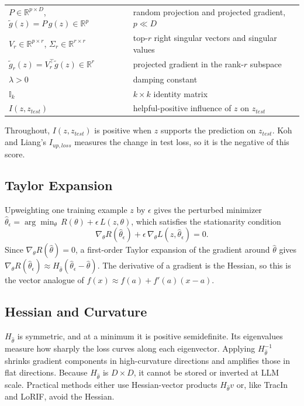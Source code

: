 \documentclass{article}
\newcommand{\hth}{\hat{\theta}}                 %
\newcommand{\Hh}{H_{\hat{\theta}}}              %
\newcommand{\gr}[1]{g(#1)}                      %
\newcommand{\gt}[1]{\tilde{g}(#1)}              %
\newcommand{\gtr}[1]{\tilde{g}_r(#1)}           %
\begin{document}
\begin{center}
\begin{tabular}{@{}ll@{}}
        $P\in\mathbb{R}^{p\times D}$, $\gt{z}=P\,\gr{z}\in\mathbb{R}^{p}$   & random projection and projected gradient, $p\ll D$ \\
        $V_r\in\mathbb{R}^{p\times r}$, $\Sigma_r\in\mathbb{R}^{r\times r}$ & top-$r$ right singular vectors and singular values \\
        $\gtr{z}=V_r^\top\gt{z}\in\mathbb{R}^{r}$                           & projected gradient in the rank-$r$ subspace        \\
        $\lambda>0$                                                         & damping constant                                   \\
        $\mathbb{I}_{k}$                                                    & $k\times k$ identity matrix                        \\
        $I(z,z_{test})$                                                     & helpful-positive influence of $z$ on $z_{test}$    \\
        \bottomrule
    \end{tabular}
\end{center}

\medskip
Throughout, $I(z,z_{test})$ is positive when $z$ supports the prediction on $z_{test}$. Koh and Liang's $I_{up,loss}$ measures the change in test loss, so it is the negative of this score.

\subsection{Taylor Expansion}
Upweighting one training example $z$ by $\epsilon$ gives the perturbed minimizer $\hth_\epsilon=\arg\min_\theta\,R(\theta)+\epsilon\,L(z,\theta)$, which satisfies the stationarity condition
\begin{equation}\label{eq:stat}
    \nabla_\theta R(\hth_\epsilon)+\epsilon\,\nabla_\theta L(z,\hth_\epsilon)=0.
\end{equation}
Since $\nabla_\theta R(\hth)=0$, a first-order Taylor expansion of the gradient around $\hth$ gives $\nabla_\theta R(\hth_\epsilon)\approx\Hh(\hth_\epsilon-\hth)$. The derivative of a gradient is the Hessian, so this is the vector analogue of $f(x)\approx f(a)+f'(a)(x-a)$.

\subsection{Hessian and Curvature}
$\Hh$ is symmetric, and at a minimum it is positive semidefinite. Its eigenvalues measure how sharply the loss curves along each eigenvector. Applying $\Hh^{-1}$ shrinks gradient components in high-curvature directions and amplifies those in flat directions. Because $\Hh$ is $D\times D$, it cannot be stored or inverted at LLM scale. Practical methods either use Hessian-vector products $\Hh v$ or, like TracIn and LoRIF, avoid the Hessian.
\end{document}
